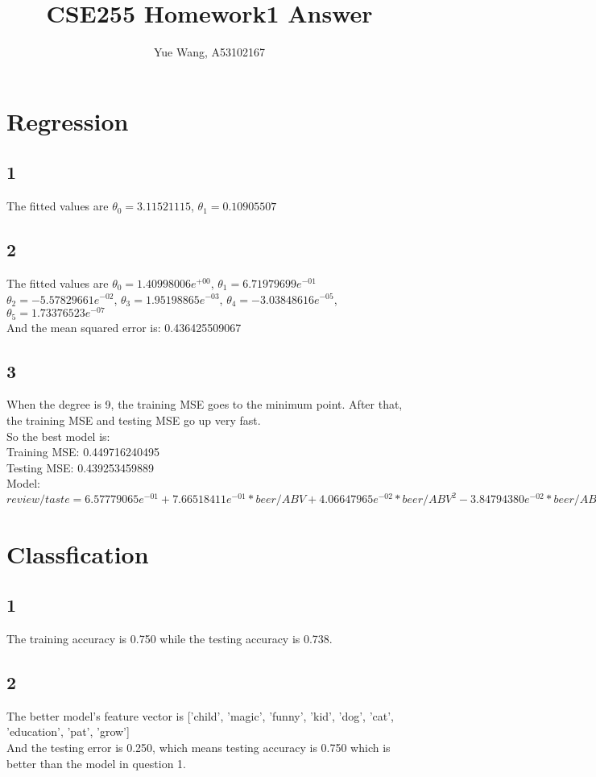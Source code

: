 \documentclass [11pt, a4paper, oneside] {article}
\author {Yue Wang, A53102167}
\title {CSE255 Homework1 Answer}
\begin{document}
\maketitle
\section *{Regression}
\subsection *{1}
The fitted values are $\theta_0 = 3.11521115$, $\theta_1 = 0.10905507$ \\
\subsection *{2}
The fitted values are $\theta_0 = 1.40998006e^{+00}$, $\theta_1 = 6.71979699e^{-01}$ $\theta_2 = -5.57829661e^{-02} $, $\theta_3 = 1.95198865e^{-03}$, $\theta_4 = -3.03848616e^{-05}$, $\theta_5 = 1.73376523e^{-07}$\\
And the mean squared error is: 0.436425509067\\
\subsection *{3}
When the degree is 9, the training MSE goes to the minimum point. After that, the training MSE and testing MSE go up very fast.\\
So the best model is:\\
Training MSE: 0.449716240495\\
Testing MSE: 0.439253459889\\
Model:\\
$ review/taste = 6.57779065e^{-01} +  7.66518411e^{-01}*beer/ABV + 4.06647965e^{-02}*beer/ABV^2 - 3.84794380e^{-02}*beer/ABV^3 + 
6.77043490e^{-03}*beer/ABV^4 - 5.85586427e^{-04}*beer/ABV^5 + 2.71796542e^{-05}*beer/ABV^6 - 6.83946306e^{-07}*beer/ABV^7
 + 8.76795980e^{-09}*beer/ABV^8 - 4.47490401e^{-11}*beer/ABV^9$\\
\section *{Classfication}
\subsection *{1}
The training accuracy is 0.750 while the testing accuracy is 0.738.\\
\subsection *{2}
The better model's feature vector is ['child', 'magic', 'funny', 'kid', 'dog', 'cat', 'education', 'pat', 'grow'] \\
And the testing error is 0.250, which means testing accuracy is 0.750 which is better than the model in question 1.\\
\end{document}
